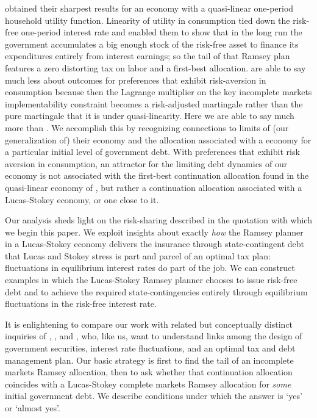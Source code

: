 \documentclass[12pt]{article}
\begin{document}
\citeauthor{Aiyagari2002} obtained their sharpest results for an economy with a quasi-linear one-period household  utility function.
 Linearity of utility in consumption tied down the risk-free one-period interest rate and enabled them to show  that in the long run
 the government accumulates a big enough stock of the risk-free asset  to finance its expenditures entirely from interest earnings;
 so the tail of that \citeauthor{Aiyagari2002}  Ramsey plan features a zero distorting tax on labor and a first-best allocation.
\citeauthor{Aiyagari2002} are able to say much less about outcomes for  preferences that exhibit risk-aversion in consumption because then the Lagrange multiplier
on the key incomplete markets implementability constraint becomes a risk-adjusted martingale rather than the pure martingale that it is under quasi-linearity.
Here we are able to say much more  than \citeauthor{Aiyagari2002}. We accomplish this by recognizing connections to limits of (our generalization of)
their economy and the allocation associated with a \citeauthor{LucasJr.1983} economy for a particular initial level of government debt.
With preferences that exhibit risk aversion in consumption, an attractor for the limiting debt dynamics of our economy is not associated with  the first-best
continuation
allocation  found in the quasi-linear economy of \citeauthor{Aiyagari2002}, but rather a continuation allocation associated with a Lucas-Stokey economy,
or one close to it.

Our analysis sheds light on the risk-sharing described in the quotation with which we begin this paper.
We  exploit insights about exactly {\em how} the Ramsey planner
in a Lucas-Stokey economy delivers the insurance through state-contingent debt that Lucas and Stokey stress is part and parcel of an optimal tax plan:
fluctuations in
 equilibrium interest rates do part of the job.  We can construct examples in which the Lucas-Stokey Ramsey planner chooses to issue risk-free debt and to
 achieve the required state-contingencies entirely through equilibrium fluctuations in the risk-free  interest rate.

 It is enlightening to compare our work  with related but conceptually distinct  inquiries of \citet{Angeletos}, \citet{Buera_Nicolini}, and \citet{Shin2007},
 who, like us,   want to understand  links among the design of  government securities, interest rate fluctuations,  and an optimal tax and
debt management plan.
Our basic strategy is first to find the tail of an   incomplete markets Ramsey allocation,
then to ask whether that continuation allocation coincides with a Lucas-Stokey complete markets Ramsey allocation for {\em some} initial government debt.
We describe conditions under which the
answer is `yes' or `almost yes'.
\end{document}
